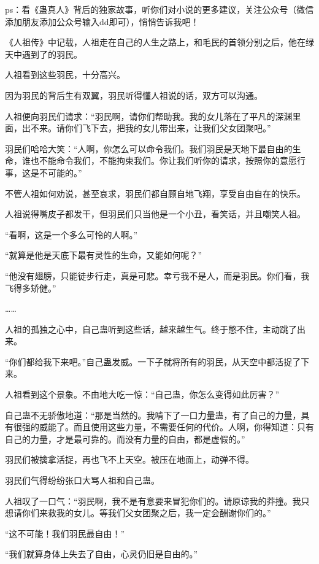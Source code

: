 
\begin{this_body}

ps：看《蛊真人》背后的独家故事，听你们对小说的更多建议，关注公众号（微信添加朋友添加公众号输入dd即可），悄悄告诉我吧！

《人祖传》中记载，人祖走在自己的人生之路上，和毛民的首领分别之后，他在绿天中遇到了的羽民。

人祖看到这些羽民，十分高兴。

因为羽民的背后生有双翼，羽民听得懂人祖说的话，双方可以沟通。

人祖便向羽民们请求：“羽民啊，请你们帮助我。我的女儿落在了平凡的深渊里面，出不来。请你们飞下去，把我的女儿带出来，让我们父女团聚吧。”

羽民们哈哈大笑：“人啊，你怎么可以命令我们。我们羽民是天地下最自由的生命，谁也不能命令我们，不能拘束我们。你让我们听你的请求，按照你的意愿行事，这是不可能的。”

不管人祖如何劝说，甚至哀求，羽民们都自顾自地飞翔，享受自由自在的快乐。

人祖说得嘴皮子都发干，但羽民们只当他是一个小丑，看笑话，并且嘲笑人祖。

“看啊，这是一个多么可怜的人啊。”

“就算是他是天底下最有灵性的生命，又能如何呢？”

“他没有翅膀，只能徒步行走，真是可悲。幸亏我不是人，而是羽民。你们看，我飞得多矫健。”

……

人祖的孤独之心中，自己蛊听到这些话，越来越生气。终于憋不住，主动跳了出来。

“你们都给我下来吧。”自己蛊发威。一下子就将所有的羽民，从天空中都活捉了下来。

人祖看到这个景象。不由地大吃一惊：“自己蛊，你怎么变得如此厉害？”

自己蛊不无骄傲地道：“那是当然的。我啃下了一口力量蛊，有了自己的力量，具有很强的威能了。而且使用这些力量，不需要任何的代价。人啊，你得知道：只有自己的力量，才是最可靠的。而没有力量的自由，都是虚假的。”

羽民们被擒拿活捉，再也飞不上天空。被压在地面上，动弹不得。

羽民们气得纷纷张口大骂人祖和自己蛊。

人祖叹了一口气：“羽民啊，我不是有意要来冒犯你们的。请原谅我的莽撞。我只想请你们来救我的女儿。等我们父女团聚之后，我一定会酬谢你们的。”

“这不可能！我们羽民最自由！”

“我们就算身体上失去了自由，心灵仍旧是自由的。”


\end{this_body}

